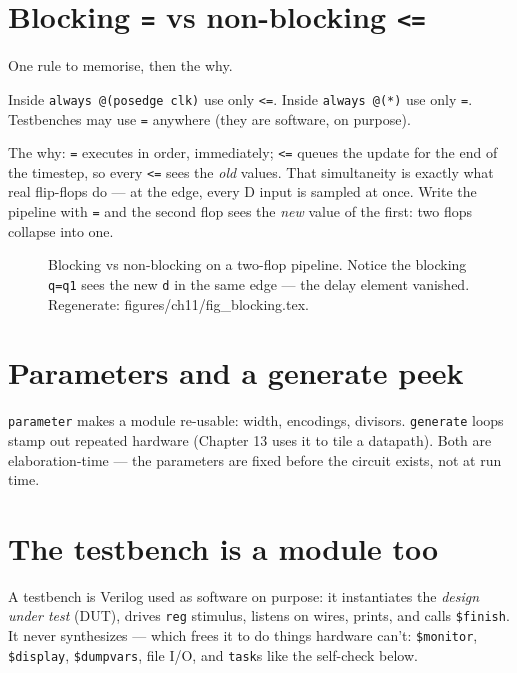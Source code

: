 \section{Blocking \texttt{=} vs non-blocking \texttt{<=}}\label{sec:nb}

 One rule to
memorise, then the why.

\begin{rulebox}
Inside \texttt{always @(posedge clk)} use only \texttt{<=}.
Inside \texttt{always @(*)} use only \texttt{=}.
Testbenches may use \texttt{=} anywhere (they are software, on purpose).
\end{rulebox}

The why: \texttt{=} executes in order, immediately; \texttt{<=} queues
the update for the end of the timestep, so every \texttt{<=} sees the
\emph{old} values. That simultaneity is exactly what real flip-flops do
--- at the edge, every D input is sampled at once. Write the pipeline
with \texttt{=} and the second flop sees the \emph{new} value of the
first: two flops collapse into one.

\begin{figure}[htbp]
\centering

\caption{Blocking vs non-blocking on a two-flop pipeline. Notice the
blocking \texttt{q=q1} sees the new \texttt{d} in the same edge ---
the delay element vanished. Regenerate:
\ttfamily figures/ch11/fig\_blocking.tex.}
\label{fig:blocking}
\end{figure}

\section{Parameters and a generate peek}\label{sec:params}

\texttt{parameter} makes a module
re-usable: width, encodings, divisors. \texttt{generate} loops stamp
out repeated hardware (Chapter 13 uses it to tile a datapath). Both are
elaboration-time --- the parameters are fixed before the circuit
exists, not at run time.

\section{The testbench is a module too}\label{sec:tb}

 A testbench is Verilog used as software on purpose:
it instantiates the \emph{design under test} (DUT), drives \texttt{reg} stimulus, listens on wires,
prints, and calls \texttt{\$finish}. It never synthesizes --- which
frees it to do things hardware can't: \texttt{\$monitor},
\texttt{\$display}, \texttt{\$dumpvars}, file I/O, and \texttt{task}s
like the self-check below.

